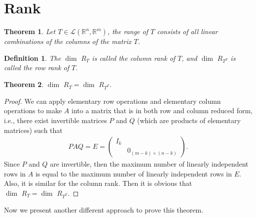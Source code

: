 \documentclass[11pt]{book}
\newtheorem{definition}{Definition}[chapter]
\newtheorem{theorem}{Theorem}[chapter]
\theoremstyle{definition}
\numberwithin{equation}{chapter}
\begin{document}
\medskip

\section{Rank}
\begin{theorem}
Let $T\in\mathscr{L}(\mathbb{R}^n,\mathbb{R}^m)$, the range of $T$ consists of all linear combinations of the columns of the matrix $T$.
\end{theorem}

\medskip

\begin{definition}
The $ \dim \,\, R_T$ is called the column rank of $T$, and $ \dim \,\, R_{T^T}$ is called the row rank of $T$.
\end{definition}

\begin{theorem}
$ \dim \,\,R_T =  \dim \,\, R_{T^T}$.
\end{theorem}
\begin{proof}
We can apply elementary row operations and elementary column operations to make $A$ into a matrix that is in both row and column reduced form, i.e., there exist invertible matrices $P$ and $Q$ (which are products of elementary matrices) such that
\begin{align*}
    PAQ = E = \left(
        \begin{matrix}
        I_{k} &  \\
         & 0_{(m-k)\times (n-k)}
        \end{matrix}
    \right).
\end{align*}
Since $P$ and $Q$ are invertible, then the maximum number of linearly independent rows in $A$ is equal to the maximum number of linearly independent rows in $E$. Also, it is similar for the column rank. Then it is obvious that $ \dim \,\,R_T =  \dim \,\, R_{T^T}$.
\end{proof}

Now we present another different approach to prove this theorem.
\end{document}
